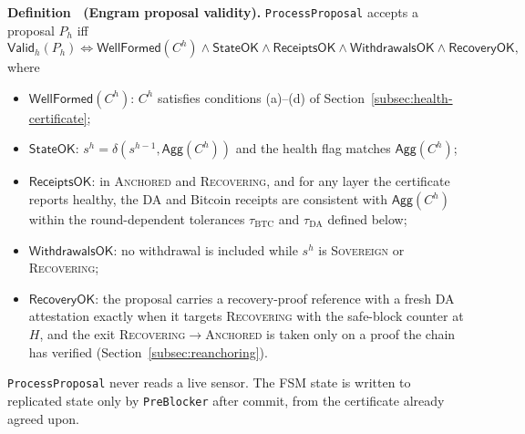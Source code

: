 \label{def:validity}\textbf{Definition~\thedefinition{} (Engram proposal validity).} \texttt{ProcessProposal}
accepts a proposal $P_h$ iff
\begin{equation}
\mathsf{Valid}_h(P_h) \iff \mathsf{WellFormed}(C^{h}) \wedge \mathsf{StateOK}
\wedge \mathsf{ReceiptsOK} \wedge \mathsf{WithdrawalsOK} \wedge
\mathsf{RecoveryOK},
\label{eq:valid}
\end{equation}
where
\begin{itemize}
  \item $\mathsf{WellFormed}(C^{h})$: $C^{h}$ satisfies conditions (a)--(d) of
  Section~\ref{subsec:health-certificate};
  \item $\mathsf{StateOK}$: $s^{h} = \delta(s^{h-1}, \mathsf{Agg}(C^{h}))$ and
  the health flag matches $\mathsf{Agg}(C^{h})$;
  \item $\mathsf{ReceiptsOK}$: in \textsc{Anchored} and \textsc{Recovering},
  and for any layer the certificate reports healthy, the DA and Bitcoin
  receipts are consistent with $\mathsf{Agg}(C^{h})$ within the round-dependent
  tolerances $\tau_{\text{BTC}}$ and $\tau_{\text{DA}}$ defined below;
  \item $\mathsf{WithdrawalsOK}$: no withdrawal is included while $s^{h}$ is
  \textsc{Sovereign} or \textsc{Recovering};
  \item $\mathsf{RecoveryOK}$: the proposal carries a recovery-proof reference
  with a fresh DA attestation exactly when it targets \textsc{Recovering} with
  the safe-block counter at $H$, and the exit
  \textsc{Recovering}$\to$\textsc{Anchored} is taken only on a proof the chain
  has verified (Section~\ref{subsec:reanchoring}).
\end{itemize}
\texttt{ProcessProposal} never reads a live sensor. The FSM state is written
to replicated state only by \texttt{PreBlocker} after commit, from the
certificate already agreed upon.

